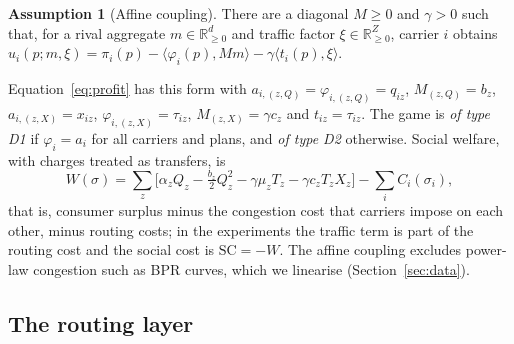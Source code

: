 \documentclass[preprint,11pt]{elsarticle}
\theoremstyle{definition}
\newtheorem{assumption}{Assumption}
\theoremstyle{remark}
\newcommand{\R}{\mathbb{R}}
\newcommand{\ip}[2]{\langle #1,#2\rangle}
\begin{document}
\begin{assumption}[Affine coupling]\label{ass:affine}
There are a diagonal $M\ge0$ and $\gamma>0$ such that, for a rival aggregate $m\in\R^d_{\ge0}$ and traffic factor $\xi\in\R^Z_{\ge0}$, carrier $i$ obtains $u_i(p;m,\xi)=\pi_i(p)-\ip{\varphi_i(p)}{Mm}-\gamma\ip{t_i(p)}{\xi}$.
\end{assumption}

Equation~\eqref{eq:profit} has this form with $a_{i,(z,Q)}=\varphi_{i,(z,Q)}=q_{iz}$, $M_{(z,Q)}=b_z$, $a_{i,(z,X)}=x_{iz}$, $\varphi_{i,(z,X)}=\tau_{iz}$, $M_{(z,X)}=\gamma c_z$ and $t_{iz}=\tau_{iz}$. The game is \emph{of type D1} if $\varphi_i=a_i$ for all carriers and plans, and \emph{of type D2} otherwise. Social welfare, with charges treated as transfers, is
\begin{equation}\label{eq:welfare}
W(\sigma)=\sum_z\big[\alpha_zQ_z-\tfrac{b_z}{2}Q_z^2-\gamma\mu_zT_z-\gamma c_zT_zX_z\big]-\sum_iC_i(\sigma_i),
\end{equation}
that is, consumer surplus minus the congestion cost that carriers impose on each other, minus routing costs; in the experiments the traffic term is part of the routing cost and the social cost is $\mathrm{SC}=-W$. The affine coupling excludes power-law congestion such as BPR curves, which we linearise (Section~\ref{sec:data}).

\subsection{The routing layer}\label{sec:routing}
\end{document}
